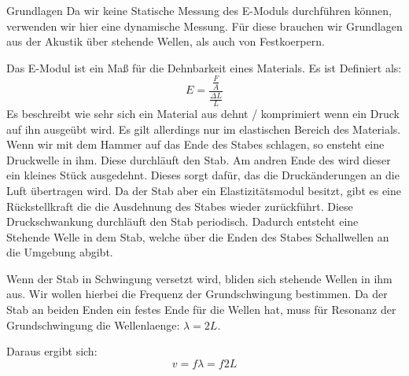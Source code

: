 \documentclass[twoside]{protokoll}
\begin{document}
\begin{aufgabe}{Grundlagen}
    Da wir keine Statische Messung des E-Moduls durchführen können, verwenden wir hier eine dynamische Messung.
    Für diese brauchen wir Grundlagen aus der Akustik über stehende Wellen, als auch von Festkoerpern.


    Das E-Modul ist ein Maß für die Dehnbarkeit eines Materials. Es ist Definiert als: 
    \begin{equation}
        E = \frac{\frac{F}{A}}{\frac{\Delta L}{L}}
    \end{equation}
    Es beschreibt wie sehr sich ein Material aus dehnt / komprimiert wenn ein Druck auf ihn ausgeübt wird.
    Es gilt allerdings nur im elastischen Bereich des Materials.\\
    
    Wenn wir mit dem Hammer auf das Ende des Stabes schlagen, so ensteht eine Druckwelle in ihm.
    Diese durchläuft den Stab. Am andren Ende des wird dieser ein kleines Stück ausgedehnt.
    Dieses sorgt dafür, das die Druckänderungen an die Luft übertragen wird.
    Da der Stab aber ein Elastizitätsmodul besitzt, gibt es eine Rückstellkraft die die Ausdehnung des Stabes wieder zurückführt.
    Diese Druckschwankung durchläuft den Stab periodisch.
    Dadurch entsteht eine Stehende Welle in dem Stab, welche über die Enden des Stabes Schallwellen an die Umgebung abgibt.

    Wenn der Stab in Schwingung versetzt wird, bliden sich stehende Wellen in ihm aus.
    Wir wollen hierbei die Frequenz der Grundschwingung bestimmen.
    Da der Stab an beiden Enden ein festes Ende für die Wellen hat, muss für Resonanz der Grundschwingung die Wellenlaenge: $\lambda = 2 L$. 
     
    Daraus ergibt sich:
    \begin{equation}
        v = f \lambda = f 2 L
    \end{equation}


\end{aufgabe}
\end{document}
